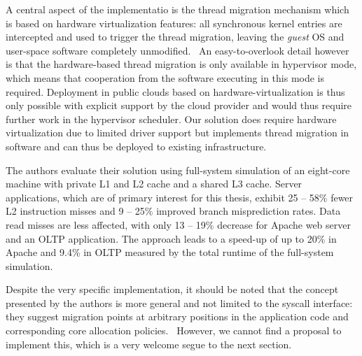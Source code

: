 \documentclass[12pt,a4paper]{book}
\begin{document}
A central aspect of the implementatio is the thread migration mechanism which is based on hardware virtualization features:
all synchronous kernel entries are intercepted and used to trigger the thread migration, leaving the \textit{guest} OS and user-space software completely unmodified.~\cite{compspr}
An easy-to-overlook detail however is that the hardware-based thread migration is only available in hypervisor mode, which means that cooperation from the software executing in this mode is required.
Deployment in public clouds based on hardware-virtualization is thus only possible with explicit support by the cloud provider and would thus require further work in the hypervisor scheduler.
Our solution does require hardware virtualization due to limited driver support but implements thread migration in software and can thus be deployed to existing infrastructure.

The authors evaluate their solution using full-system simulation of an eight-core machine with private L1 and L2 cache and a shared L3 cache.
Server applications, which are of primary interest for this thesis, exhibit 25 -- 58\% fewer L2 instruction misses and 9 -- 25\% improved branch misprediction rates.
Data read misses are less affected, with only 13 -- 19\% decrease for Apache web server and an OLTP application.
The approach leads to a speed-up of up to 20\% in Apache and 9.4\% in OLTP measured by the total runtime of the full-system simulation.~\cite{compspr}

Despite the very specific implementation, it should be noted that the concept presented by the authors is more general and not limited to the syscall interface:
they suggest migration points at arbitrary positions in the application code and corresponding core allocation policies.~\cite{compspr}
However, we cannot find a proposal to implement this, which is a very welcome segue to the next section.
\end{document}
